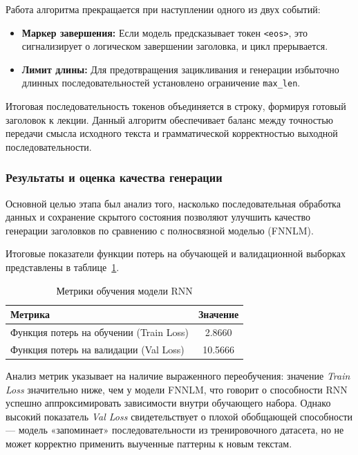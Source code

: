 \documentclass[coursework]{SCWorks}
\begin{document}
    Работа алгоритма прекращается при наступлении одного из двух событий:
    \begin{itemize}
        \item \textbf{Маркер завершения:} Если модель предсказывает токен \texttt{<eos>}, это сигнализирует о логическом завершении заголовка, и цикл прерывается.
        \item \textbf{Лимит длины:} Для предотвращения зацикливания и генерации избыточно длинных последовательностей установлено ограничение \texttt{max\_len}.
    \end{itemize}

    Итоговая последовательность токенов объединяется в строку, формируя готовый заголовок к лекции.
    Данный алгоритм обеспечивает баланс между точностью передачи смысла исходного текста
    и грамматической корректностью выходной последовательности.

    \subsubsection{Результаты и оценка качества генерации}

    Основной целью этапа был анализ того, насколько последовательная обработка данных и сохранение скрытого состояния позволяют улучшить
    качество генерации заголовков по сравнению с полносвязной моделью (FNNLM).

    Итоговые показатели функции потерь на обучающей и валидационной выборках представлены в таблице~\ref{tab:rnn_metrics}.

    \begin{table}[h!]
        \centering
        \caption{Метрики обучения модели RNN}
        \label{tab:rnn_metrics}
        \begin{tabular}{|l|c|}
            \hline
            \textbf{Метрика}                        & \textbf{Значение} \\ \hline
            Функция потерь на обучении (Train Loss) & 2.8660            \\ \hline
            Функция потерь на валидации (Val Loss)  & 10.5666           \\ \hline
        \end{tabular}
    \end{table}

    Анализ метрик указывает на наличие выраженного переобучения: значение \textit{Train Loss} значительно ниже, чем у модели FNNLM,
    что говорит о способности RNN успешно аппроксимировать зависимости внутри обучающего набора.
    Однако высокий показатель \textit{Val Loss} свидетельствует о плохой обобщающей способности — модель «запоминает»
    последовательности из тренировочного датасета, но не может корректно применить выученные паттерны к новым текстам.
\end{document}
